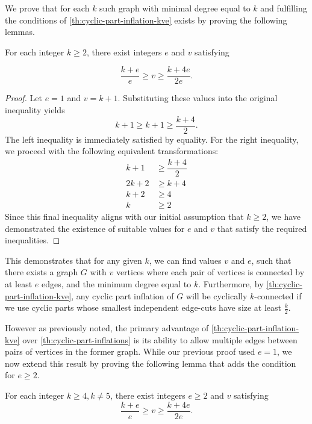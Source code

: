 \documentclass[12pt, twoside]{book}
\begin{document}
We prove that for each $k$ such graph with minimal degree equal to $k$ and fulfilling the conditions of \cref{th:cyclic-part-inflation-kve} exists by proving the following lemmas.

\begin{lemma}
	For each integer $k\geq 2$, there exist integers $e$ and $v$ satisfying
	
	$$\dfrac{k+e}{e}\geq v\geq \dfrac{k+4e}{2e}.$$
\end{lemma}

\begin{proof}
	Let $e=1$ and $v=k+1$. Substituting these values into the original inequality yields
	$$k+1\geq k+1\geq \dfrac{k+4}{2}.$$
	The left inequality is immediately satisfied by equality. For the right inequality, we proceed with the following equivalent transformations:
	\begin{align*}
		k+1&\geq \dfrac{k+4}{2} \\
		2k+2&\geq k+4 \\
		k+2&\geq 4 \\
		k&\geq 2
	\end{align*}
	Since this final inequality aligns with our initial assumption that $k\geq 2$, we have demonstrated the existence of suitable values for $e$ and $v$ that satisfy the required inequalities.
\end{proof}

This demonstrates that for any given $k$, we can find values $v$ and $e$, such that there exists a graph $G$ with $v$ vertices where each pair of vertices is connected by at least $e$ edges, and the minimum degree equal to $k$. Furthermore, by \cref{th:cyclic-part-inflation-kve}, any cyclic part inflation of $G$ will be cyclically $k$-connected if we use cyclic parts whose smallest independent edge-cuts have size at least $\frac{k}{2}$.

However as previously noted, the primary advantage of \cref{th:cyclic-part-inflation-kve} over \cref{th:cyclic-part-inflations} is its ability to allow multiple edges between pairs of vertices in the former graph. While our previous proof used $e=1$, we now extend this result by proving the following lemma that adds the condition for $e\geq 2$.

\begin{lemma}
	For each integer $k\geq 4, k\neq 5$, there exist integers $e\geq 2$ and $v$ satisfying
	$$\dfrac{k+e}{e}\geq v\geq \dfrac{k+4e}{2e}.$$
\end{lemma}
\end{document}
